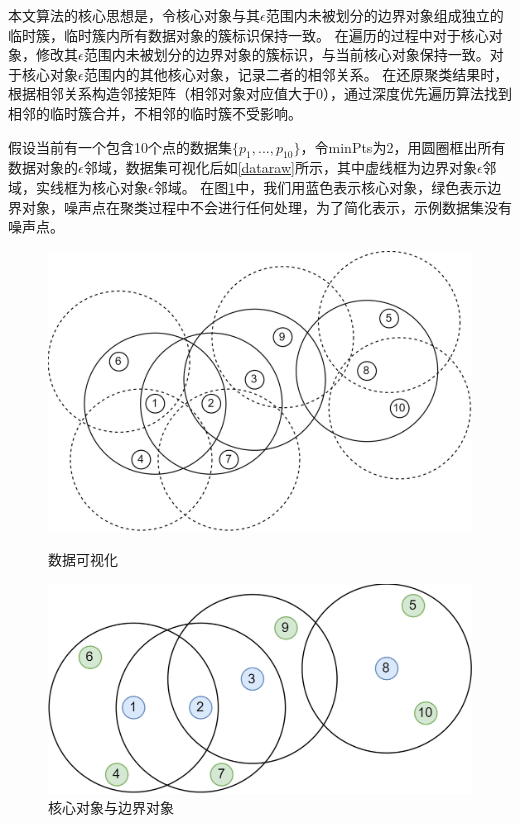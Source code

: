 \documentclass[12pt, a4paper, oneside]{ctexart}
\begin{document}
\newpage

本文算法的核心思想是，令核心对象与其$ \epsilon $范围内未被划分的边界对象组成独立的临时簇，临时簇内所有数据对象的簇标识保持一致。
在遍历的过程中对于核心对象，修改其$ \epsilon $范围内未被划分的边界对象的簇标识，与当前核心对象保持一致。对于核心对象$ \epsilon $范围内的其他核心对象，记录二者的相邻关系。
在还原聚类结果时，根据相邻关系构造邻接矩阵（相邻对象对应值大于0），通过深度优先遍历算法找到相邻的临时簇合并，不相邻的临时簇不受影响。

假设当前有一个包含10个点的数据集$ \{p_1,...,p_{10}\} $，令minPts为2，用圆圈框出所有数据对象的$ \epsilon $邻域，数据集可视化后如\ref{dataraw}所示，其中虚线框为边界对象$ \epsilon $邻域，实线框为核心对象$ \epsilon $邻域。
在图\ref{dbraw}中，我们用蓝色表示核心对象，绿色表示边界对象，噪声点在聚类过程中不会进行任何处理，为了简化表示，示例数据集没有噪声点。
\begin{figure}[htbp]
	\begin{minipage}[t]{0.48\linewidth}
		\centering
		\includegraphics[width=\linewidth]{../img/dbraw.png}
		\caption{数据可视化}
		\label{dataraw}
	\end{minipage}
	\hfill
	\begin{minipage}[t]{0.48\linewidth}
		\centering
		\includegraphics[width=\linewidth]{../img/db1.png}
		\caption{核心对象与边界对象}
		\label{dbraw}
	\end{minipage}
\end{figure}
\end{document}
